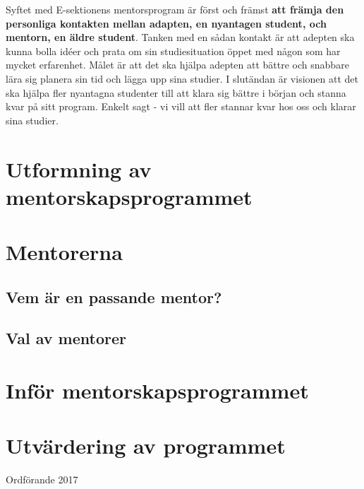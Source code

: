 \documentclass[10pt]{article}
\begin{document}
    Syftet med E-sektionens mentorsprogram är först och främst \textbf{att främja den personliga kontakten mellan adapten, en nyantagen student, och mentorn, en äldre student}.
    Tanken med en sådan kontakt är att adepten ska kunna bolla idéer och prata om sin studiesituation öppet med någon som har mycket erfarenhet.
    Målet är att det ska hjälpa adepten att bättre och snabbare lära sig planera sin tid och lägga upp sina studier. I slutändan är visionen att det ska hjälpa fler nyantagna studenter till att klara sig bättre i början och stanna kvar på sitt program. Enkelt sagt - vi vill att fler stannar kvar hos oss och klarar sina studier.

    \newpage

    \section*{Utformning av mentorskapsprogrammet}

    \section*{Mentorerna}

    \subsection*{Vem är en passande mentor?}

    \subsection*{Val av mentorer}


    \section*{Inför mentorskapsprogrammet}

    \section*{Utvärdering av programmet}

    \begin{signatures}{1}
        \signature{Erik Månsson}{Ordförande 2017}
    \end{signatures}
\end{document}
